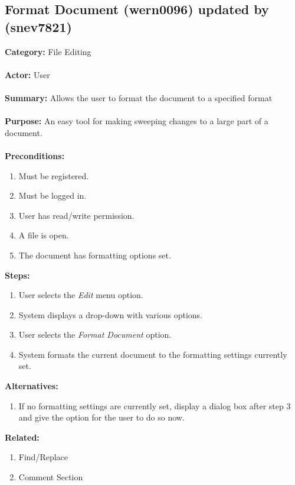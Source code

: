 \documentclass[11pt]{report}
\begin{document}
\subsection{Format Document (wern0096) updated by (snev7821)}
\begin{framed}

	\textbf{Category:} File Editing \\ \\
	\textbf{Actor:} User \\ \\
	\textbf{Summary:} Allows the user to format the document to a specified format \\ \\
	\textbf{Purpose:} An easy tool for making sweeping changes to a large part of a document. \\ \\
	\textbf{Preconditions:} 
	\begin{enumerate}
		\item Must be registered.
		\item Must be logged in.
		\item User has read/write permission.
		\item A file is open.
		\item The document has formatting options set.
	\end{enumerate}
	\textbf{Steps:}
	\begin{enumerate}
		\item User selects the \textit{Edit} menu option.
		\item System displays a drop-down with various options.
		\item User selects the \textit{Format Document} option.
		\item System formats the current document to the formatting settings currently set.
	\end{enumerate}
	\textbf{Alternatives:}
	\begin{enumerate}
		\item If no formatting settings are currently set, display a dialog box after step 3 and give the option for the user to do so now.
	\end{enumerate}
	\textbf{Related:}
	\begin{enumerate}
		\item Find/Replace
		\item Comment Section
	\end{enumerate}
\end{framed}
\end{document}
